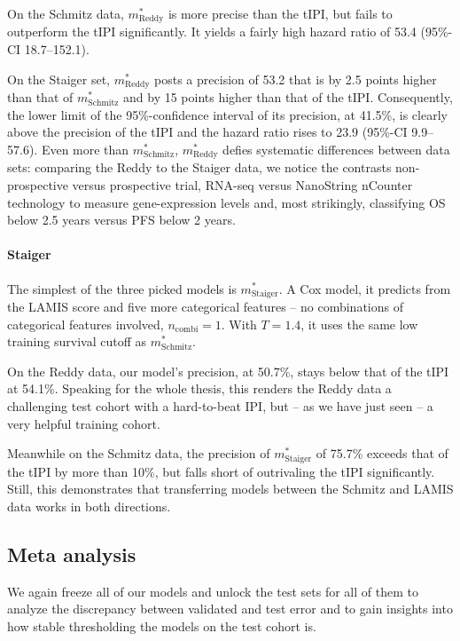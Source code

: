On the Schmitz data, $m^*_\text{Reddy}$ is more precise than the tIPI, but fails to outperform the 
tIPI significantly. It yields a fairly high hazard ratio of \num{53.4} 
(\num{95}\%-CI \num{18.7}--\num{152.1}).

On the Staiger set, $m^*_\text{Reddy}$ posts a precision of \num{53.2} that is by \num{2.5} 
points higher than that of $m^*_\text{Schmitz}$ and by \num{15} points higher than that of the tIPI. 
Consequently, the lower limit of the \num{95}\%-confidence interval of its precision, at 
\num{41.5}\%, is 
clearly above the precision of the tIPI and the hazard ratio rises to \num{23.9}
(\num{95}\%-CI \num{9.9}--\num{57.6}). Even more than $m^*_\text{Schmitz}$, $m^*_\text{Reddy}$ 
defies systematic differences between data sets: comparing the Reddy to the Staiger data, we 
notice the contrasts non-prospective versus prospective trial, 
RNA-seq versus NanoString nCounter technology to measure gene-expression levels and, most strikingly, 
classifying OS below \num{2.5} years versus PFS below \num{2} years.

\paragraph{Staiger}
The simplest of the three picked models is $m^*_\text{Staiger}$. A Cox model, it predicts from 
the LAMIS score and five more categorical features -- no combinations of categorical features involved, 
$n_\text{combi} = 1$. With $T = \num{1.4}$, it uses the same low training survival cutoff as 
$m^*_\text{Schmitz}$.

On the Reddy data, our model's precision, at \num{50.7}\%, stays below that of the tIPI at \num{54.1}\%. 
Speaking for the whole thesis, this renders the Reddy data a challenging test cohort with a 
hard-to-beat IPI, but -- as we have just seen -- a very helpful training cohort.

Meanwhile on the Schmitz data, the precision of $m^*_\text{Staiger}$ of \num{75.7}\% exceeds that 
of the tIPI by more than \num{10}\%, but falls short of outrivaling the tIPI significantly. Still, 
this demonstrates that transferring models between the Schmitz and LAMIS data works in both 
directions.

\subsection{Meta analysis}\label{subsec:results-inter-meta}

We again freeze all of our models and unlock the test sets for all of them to analyze the discrepancy 
between validated and test error and to gain insights into how stable thresholding the models on the 
test cohort is.

